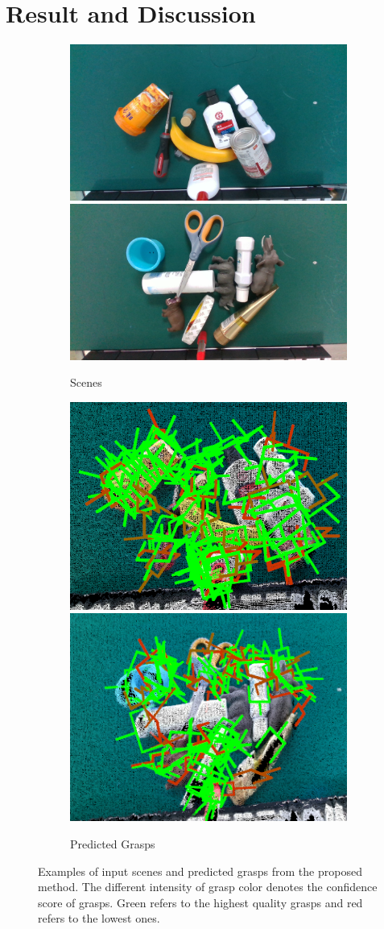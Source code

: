 \section{Result and Discussion}
\label{sec:evaluation}

\begin{figure}[h!]
  \centering
  
  \begin{subfigure}[b]{0.98\linewidth}
    \includegraphics[width=0.48\linewidth]{figs/18_0}
    \includegraphics[width=0.48\linewidth]{figs/37_0}
  \caption{Scenes}  
  \end{subfigure}
 
  \begin{subfigure}[b]{0.98\linewidth}
    \includegraphics[width=0.48\linewidth]{figs/18_0_grasp}
    \includegraphics[width=0.48\linewidth]{figs/37_0_grasp}
  \caption{Predicted Grasps}  
  \end{subfigure}  
    
  \caption{Examples of input scenes and predicted grasps from the proposed method. The different intensity of grasp color denotes the confidence score of grasps. Green refers to the highest quality grasps and red refers to the lowest ones.}
  \label{fig:grasp_result}
\end{figure}

